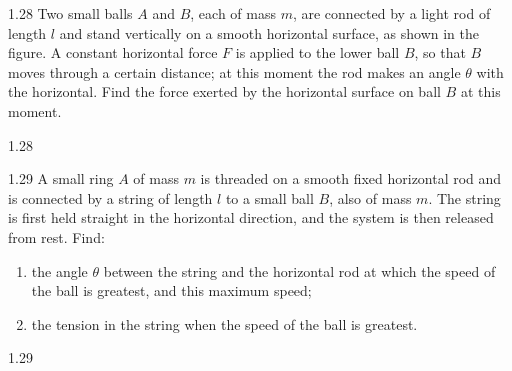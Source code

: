 \begin{problem}{1.28}
Two small balls $A$ and $B$, each of mass $m$, are connected by a light rod of length $l$ and stand vertically on a smooth horizontal surface, as shown in the figure. A constant horizontal force $F$ is applied to the lower ball $B$, so that $B$ moves through a certain distance; at this moment the rod makes an angle $\theta$ with the horizontal. Find the force exerted by the horizontal surface on ball $B$ at this moment.
\end{problem}

\begin{figbox}{1.28}
\end{figbox}

\begin{problem}{1.29}
A small ring $A$ of mass $m$ is threaded on a smooth fixed horizontal rod and is connected by a string of length $l$ to a small ball $B$, also of mass $m$. The string is first held straight in the horizontal direction, and the system is then released from rest. Find:
\begin{enumerate}[label=(\arabic*),leftmargin=2.2em,itemsep=1pt,topsep=2pt]
\item the angle $\theta$ between the string and the horizontal rod at which the speed of the ball is greatest, and this maximum speed;
\item the tension in the string when the speed of the ball is greatest.
\end{enumerate}
\end{problem}

\begin{figbox}{1.29}
\end{figbox}

